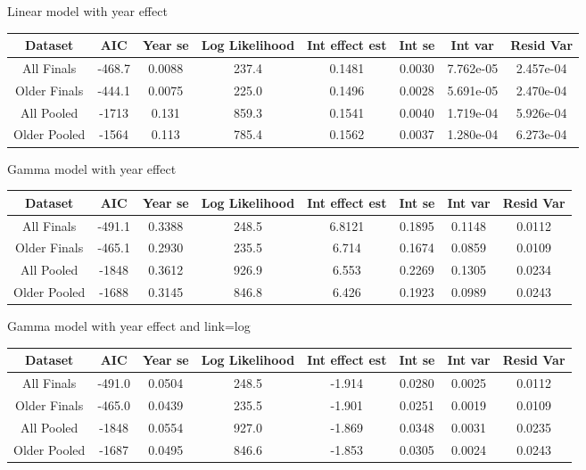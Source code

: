\documentclass[12pt, letterpaper, titlepage]{article}
\begin{document}
Linear model with year effect
\begin{center}
  \begin{tabular}{|c | c | c | c | c | c | c | c |} 
   \hline
   Dataset & AIC & Year se & Log Likelihood & Int effect est & Int se & Int var & Resid Var \\ [0.5ex] 
   \hline\hline
   All Finals & -468.7 & 0.0088 & 237.4 & 0.1481 & 0.0030 & 7.762e-05 & 2.457e-04 \\
   \hline
   Older Finals & -444.1 & 0.0075 & 225.0 & 0.1496 & 0.0028 & 5.691e-05 & 2.470e-04 \\ 
   \hline
   All Pooled & -1713 & 0.131 & 859.3 & 0.1541 & 0.0040 & 1.719e-04 & 5.926e-04 \\
   \hline
   Older Pooled & -1564 & 0.113 & 785.4 & 0.1562 & 0.0037 & 1.280e-04 & 6.273e-04 \\
   \hline
  \end{tabular}
  \end{center}

Gamma model with year effect
\begin{center}
  \begin{tabular}{|c | c | c | c | c | c | c | c |} 
   \hline
   Dataset & AIC & Year se & Log Likelihood & Int effect est & Int se & Int var & Resid Var \\ [0.5ex] 
   \hline\hline
   All Finals & -491.1 & 0.3388 & 248.5 & 6.8121 & 0.1895 & 0.1148 & 0.0112 \\
   \hline
   Older Finals & -465.1 & 0.2930 & 235.5 & 6.714 & 0.1674 & 0.0859 & 0.0109 \\ 
   \hline
   All Pooled & -1848 & 0.3612 & 926.9 & 6.553 & 0.2269 & 0.1305 & 0.0234 \\
   \hline
   Older Pooled & -1688 & 0.3145 & 846.8 & 6.426 & 0.1923 & 0.0989 & 0.0243 \\
   \hline
  \end{tabular}
  \end{center}

Gamma model with year effect and link=log
\begin{center}
  \begin{tabular}{|c | c | c | c | c | c | c | c |} 
   \hline
   Dataset & AIC & Year se & Log Likelihood & Int effect est & Int se & Int var & Resid Var \\ [0.5ex] 
   \hline\hline
   All Finals & -491.0 & 0.0504 & 248.5 & -1.914 & 0.0280 & 0.0025 & 0.0112 \\
   \hline
   Older Finals & -465.0 & 0.0439 & 235.5 & -1.901 & 0.0251 & 0.0019 & 0.0109 \\ 
   \hline
   All Pooled & -1848 & 0.0554 & 927.0 & -1.869 & 0.0348 & 0.0031 & 0.0235 \\
   \hline
   Older Pooled & -1687 & 0.0495 & 846.6 & -1.853 & 0.0305 & 0.0024 & 0.0243 \\
   \hline
  \end{tabular}
  \end{center}
\end{document}
